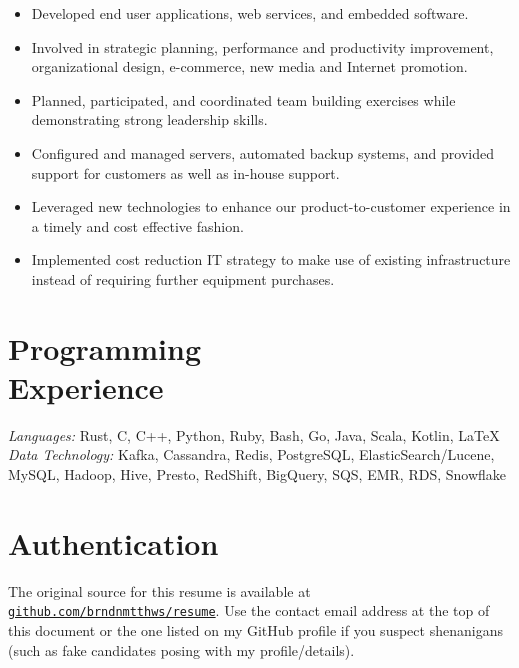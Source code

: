 \documentclass[margin,line]{resume}
\begin{document}
\begin{resume}
    \begin{itemize}
        \item Developed end user applications, web services, and embedded
        software.
        \item Involved in strategic planning, performance and productivity
        improvement, organizational design, e-commerce, new media and Internet
        promotion.
        \item Planned, participated, and coordinated team building exercises
        while demonstrating strong leadership skills.
        \item Configured and managed servers, automated backup systems, and
        provided support for customers as well as in-house support.
        \item Leveraged new technologies to enhance our product-to-customer
        experience in a timely and cost effective fashion.
        \item Implemented cost reduction IT strategy to make use of existing
        infrastructure instead of requiring further equipment purchases.
    \end{itemize}

    \vspace{3mm}
    
    \section{\mysidestyle Programming\\Experience}

    \emph{Languages:} Rust, C, C++, Python, Ruby, Bash, Go, Java, Scala, Kotlin, \LaTeX \\
    \emph{Data Technology:} Kafka, Cassandra, Redis, PostgreSQL, ElasticSearch/Lucene,
     MySQL, Hadoop, Hive, Presto, RedShift, BigQuery, SQS, EMR, RDS, Snowflake

    \section{\mysidestyle Authentication}

    The original source for this resume is available at
    \href{https://github.com/brndnmtthws/resume}{\texttt{github.com/brndnmtthws/resume}}.
    Use the contact email address at the top of this document or the one listed
    on my GitHub profile if you suspect shenanigans (such as fake candidates
    posing with my profile/details).
\end{resume}
\end{document}
